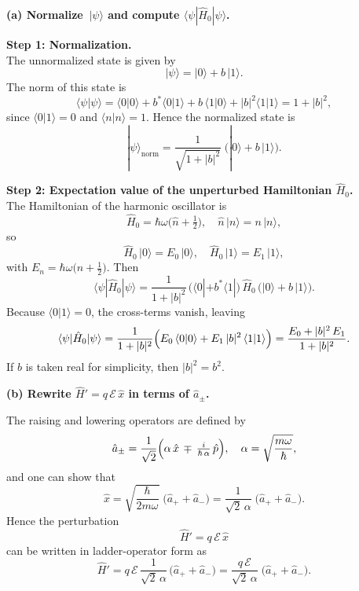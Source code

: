\documentclass{article}
\begin{document}
\bigskip

\textbf{(a) Normalize \(\,|\psi\rangle\) and compute \(\langle \psi|\hat{H}_0|\psi\rangle\). \quad [5 marks]}

\textbf{Step 1: Normalization.}\\
The unnormalized state is given by
\[
|\psi\rangle = |0\rangle + b\,|1\rangle.
\]
The norm of this state is
\[
\langle \psi|\psi\rangle 
= \langle 0|0\rangle + b^*\langle 0|1\rangle + b\,\langle 1|0\rangle + |b|^2\langle 1|1\rangle
= 1 + |b|^2,
\]
since \(\langle 0|1\rangle = 0\) and \(\langle n|n\rangle =1\). Hence the normalized state is
\[
|\psi\rangle_{\text{norm}} 
= \frac{1}{\sqrt{1 + |b|^2}}\;\bigl(|0\rangle + b\,|1\rangle\bigr).
\]

\textbf{Step 2: Expectation value of the unperturbed Hamiltonian \(\hat{H}_0\).}\\
The Hamiltonian of the harmonic oscillator is
\[
\hat{H}_0 = \hbar\omega\bigl(\hat{n} + \tfrac12\bigr), 
\quad
\hat{n}\,|n\rangle = n\,|n\rangle,
\]
so
\[
\hat{H}_0\,|0\rangle = E_0\,|0\rangle,
\quad
\hat{H}_0\,|1\rangle = E_1\,|1\rangle,
\]
with \(E_n = \hbar\omega\bigl(n+\tfrac12\bigr)\). Then
\[
\langle \psi|\hat{H}_0|\psi\rangle 
= \frac{1}{1 + |b|^2}
\,\bigl(\langle 0| + b^*\langle 1|\bigr)\,\hat{H}_0\,\bigl(|0\rangle + b\,|1\rangle\bigr).
\]
Because \(\langle 0|1\rangle=0\), the cross-terms vanish, leaving
\[
\langle \psi|\hat{H}_0|\psi\rangle 
= \frac{1}{1 + |b|^2}
\Bigl(E_0\,\langle 0|0\rangle 
 + E_1\,|b|^2\,\langle 1|1\rangle\Bigr)
= \frac{E_0 + |b|^2\,E_1}{1 + |b|^2}.
\]
If \(b\) is taken real for simplicity, then \(|b|^2 = b^2\).

\bigskip

\textbf{(b) Rewrite \(\hat{H}' = q\,\mathcal{E}\,\hat{x}\) in terms of \(\hat{a}_\pm\). \quad [2 marks]}

The raising and lowering operators are defined by
\[
\hat{a}_\pm 
= \frac{1}{\sqrt{2}}\Bigl(\alpha\,\hat{x}\,\mp\,\tfrac{i}{\hbar\,\alpha}\,\hat{p}\Bigr), 
\quad
\alpha = \sqrt{\frac{m\omega}{\hbar}},
\]
and one can show that
\[
\hat{x}
= \sqrt{\frac{\hbar}{2m\omega}}\;\bigl(\hat{a}_+ + \hat{a}_-\bigr)
= \frac{1}{\sqrt{2}\,\alpha}\;\bigl(\hat{a}_+ + \hat{a}_-\bigr).
\]
Hence the perturbation
\[
\hat{H}' = q\,\mathcal{E}\,\hat{x}
\]
can be written in ladder-operator form as
\[
\hat{H}'
= q\,\mathcal{E}\,\frac{1}{\sqrt{2}\,\alpha}\,\bigl(\hat{a}_+ + \hat{a}_-\bigr)
= \frac{q\,\mathcal{E}}{\sqrt{2}\,\alpha}\;\bigl(\hat{a}_+ + \hat{a}_-\bigr).
\]

\bigskip
\end{document}
